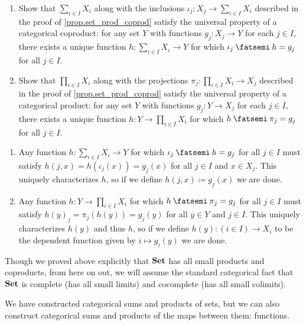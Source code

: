 \documentclass[Book-Poly]{subfiles}
\begin{document}
\begin{exercise} \label{exc.set_prod_coprod}
    \begin{enumerate}
        \item Show that $\sum_{i\in I}X_i$ along with the inclusions $\iota_j\colon X_j\to\sum_{i\in I}X_i$ described in the proof of \cref{prop.set_prod_coprod} satisfy the universal property of a categorical coproduct: for any set $Y$ with functions $g_j\colon X_j\to Y$ for each $j\in I$, there exists a unique function $h\colon\sum_{i\in I}X_i\to Y$ for which $\iota_j\then h=g_j$ for all $j\in I$.
        \item Show that $\prod_{i\in I}X_i$ along with the projections $\pi_j\colon\prod_{i\in I}X_i\to X_j$ described in the proof of \cref{prop.set_prod_coprod} satisfy the universal property of a categorical product: for any set $Y$ with functions $g_j\colon Y\to X_j$ for each $j\in I$, there exists a unique function $h\colon Y\to\prod_{i\in I}X_i$ for which $h\then\pi_j=g_j$ for all $j\in I$. \qedhere
    \end{enumerate}
    \begin{solution}
        \begin{enumerate}
            \item Any function $h\colon\sum_{i\in I}X_i\to Y$ for which $\iota_j\then h=g_j$ for all $j\in I$ must satisfy $h(j,x)=h(\iota_j(x))=g_j(x)$ for all $j\in I$ and $x\in X_j$.
            This uniquely characterizes $h$, so if we define $h(j,x)\coloneqq g_j(x)$ we are done.

            \item Any function $h\colon Y\to\prod_{i\in I}X_i$ for which $h\then\pi_j=g_j$ for all $j\in I$ must satisfy $h(y)_j=\pi_j(h(y))=g_j(y)$ for all $y\in Y$ and $j\in I$.
            This uniquely characterizes $h(y)$ and thus $h$, so if we define $h(y)\colon(i\in I)\to X_i$ to be the dependent function given by $i\mapsto g_i(y)$ we are done.
        \end{enumerate}
    \end{solution}
\end{exercise}

Though we proved above explicitly that $\mathbf{Set}$ has all small products and coproducts, from here on out, we will assume the standard categorical fact that $\mathbf{Set}$ is complete (has all small limits) and cocomplete (has all small colimits). %

We have constructed categorical sums and products of sets, but we can also construct categorical sums and products of the maps between them: functions.
\end{document}
